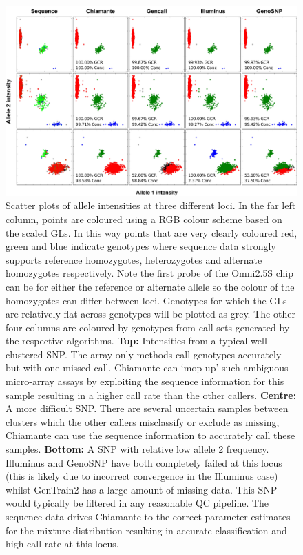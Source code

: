\clearpage
\changepage{}{}{-.5in}{-.5in}{}{}{}{}{}
\begin{figure}
  \begin{center} 
\includegraphics[width=\textwidth]{chap2figs/Fig4}
\vspace{-10pt}
    \caption[Scatter plots of allele intensities at three different loci of varying difficulty]{Scatter plots of allele intensities at three different loci.  In the far left column, points are coloured using a RGB colour scheme based on the scaled GLs. In this way points that are very clearly coloured red, green and blue indicate genotypes where sequence data strongly supports reference homozygotes, heterozygotes and alternate homozygotes respectively. Note the first probe of the Omni2.5S chip can be for either the reference or alternate allele so the colour of the homozygotes can differ between loci. Genotypes for which the GLs are relatively flat across genotypes will be plotted as grey.  The other four columns are coloured by genotypes from call sets generated by the respective algorithms. \textbf{Top:} Intensities from a typical well clustered SNP. The array-only methods call genotypes accurately but with one missed call.  Chiamante can `mop up' such ambiguous micro-array assays by exploiting the sequence information for this sample resulting in a higher call rate than the other callers. \textbf{Centre:} A more difficult SNP.   There are several uncertain samples between clusters which the other callers misclassify or exclude as missing, Chiamante can use the sequence information to accurately call these samples.  \textbf{Bottom:}  A SNP with relative low allele 2 frequency.  Illuminus and GenoSNP have both completely failed at this locus (this is likely due to incorrect convergence in the Illuminus case) whilst GenTrain2 has a large amount of missing data.  This SNP would typically be filtered in any reasonable QC pipeline.  The sequence data drives Chiamante to the correct parameter estimates for the mixture distribution resulting in accurate classification and high call rate at this locus.\label{chap2:fig:scatterplots}}
  \end{center} 
\end{figure}
\changepage{}{}{+.5in}{+.5in}{}{}{}{}{}

